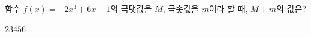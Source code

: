함수 $f(x)=-2x^3+6x+1$의 극댓값을 $M$, 극솟값을 $m$이라 할 때, $M+m$의 값은?
\begin{choices32}{$2$}{$3$}{$4$}{$5$}{$6$}\end{choices32}
